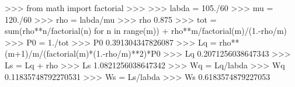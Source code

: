 
>>> from math import factorial
>>>
>>> labda = 105./60
>>> mu = 120./60
>>> rho = labda/mu
>>> rho
0.875
>>> tot = sum(rho**n/factorial(n) for n in range(m)) +
rho**m/factorial(m)/(1.-rho/m)
>>> P0 = 1./tot
>>> P0
0.391304347826087
>>> Lq = rho**(m+1)/m/(factorial(m)*(1.-rho/m)**2)*P0
>>> Lq
0.2071256038647343
>>> Ls = Lq + rho
>>> Ls
1.0821256038647342
>>> Wq = Lq/labda
>>> Wq
0.11835748792270531
>>> Ws = Ls/labda
>>> Ws
0.6183574879227053

